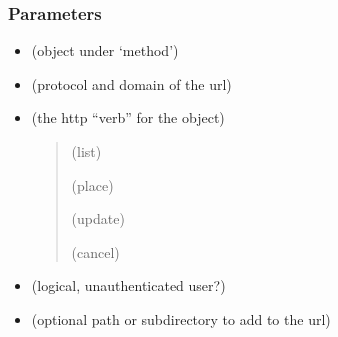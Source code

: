 \documentclass[a4paper,12pt,english]{sphinxhowto}
\begin{document}
\begin{fulllineitems}
\label{\detokenize{Sciencedata_dk:request}}
\end{fulllineitems}


\begin{sphinxVerbatim}[commandchars=\\\{\},formatcom=\footnotesize]
 
\end{sphinxVerbatim}



\subsubsection{Parameters}
\label{\detokenize{Sciencedata_dk:parameters}}\begin{itemize}
\item {} 
 (object under ‘method’)

\item {} 
 (protocol and domain of the url)

\item {} 
 (the http “verb” for the object)
\begin{quote}

 (list)

 (place)

 (update)

 (cancel)
\end{quote}

\item {} 
 (logical, unauthenticated user?)

\item {} 
 (optional path or subdirectory to add to the url)

\end{itemize}
\end{document}

